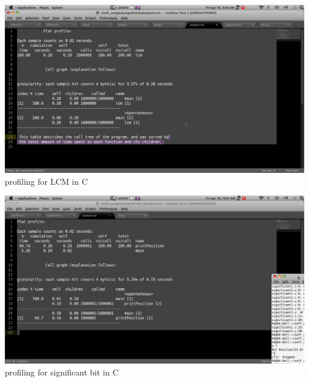 \documentclass[a4paper,12pt]{report}
\begin{document}
\begin{center}
 \includegraphics[width=13 cm,height=12 cm]{./lcm.png}
profiling  for LCM in C
\end{center}
\begin{center}
 \includegraphics[width=13 cm,height=12 cm]{./significant.png}
profiling  for significant bit  in C
\end{center}
\end{document}
